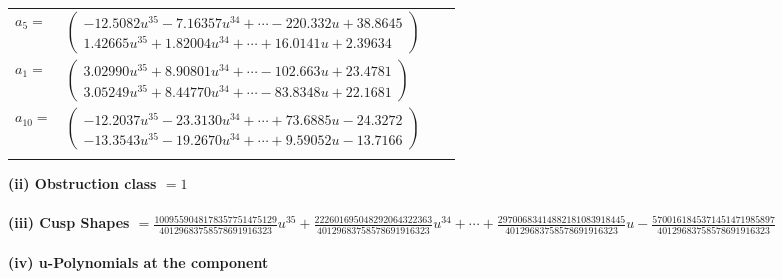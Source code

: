 \documentclass[1p]{elsarticle_modified}
\theoremstyle{definition}
\begin{document}
\begin{tabular}{m{7pt} m{180pt} m{7pt} m{180pt} }
\flushright $a_{5}=$&$\begin{pmatrix}-12.5082 u^{35}-7.16357 u^{34}+\cdots-220.332 u+38.8645\\1.42665 u^{35}+1.82004 u^{34}+\cdots+16.0141 u+2.39634\end{pmatrix}$ \\
\flushright $a_{1}=$&$\begin{pmatrix}3.02990 u^{35}+8.90801 u^{34}+\cdots-102.663 u+23.4781\\3.05249 u^{35}+8.44770 u^{34}+\cdots-83.8348 u+22.1681\end{pmatrix}$ \\
\flushright $a_{10}=$&$\begin{pmatrix}-12.2037 u^{35}-23.3130 u^{34}+\cdots+73.6885 u-24.3272\\-13.3543 u^{35}-19.2670 u^{34}+\cdots+9.59052 u-13.7166\end{pmatrix}$\\&\end{tabular}
\flushleft \textbf{(ii) Obstruction class $= 1$}\\~\\
\flushleft \textbf{(iii) Cusp Shapes $= \frac{1009559048178357751475129}{40129683758578691916323} u^{35}+\frac{222601695048292064322363}{40129683758578691916323} u^{34}+\cdots+\frac{29700683414882181083918445}{40129683758578691916323} u-\frac{5700161845371451471985897}{40129683758578691916323}$}\\~\\
\newpage\renewcommand{\arraystretch}{1}
\flushleft \textbf{(iv) u-Polynomials at the component}\newline \\
\end{document}
